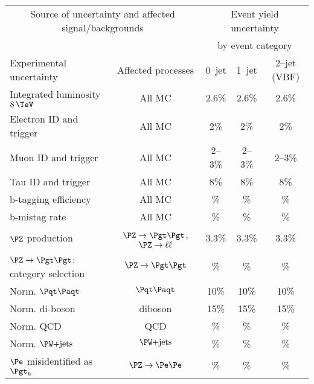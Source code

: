 
\begin{table}[tbhp]
\begin{center}
    \begin{tabular}{|l|c|c|c|c|}
    \hline
    \multicolumn{2}{|c|}{Source of uncertainty and affected signal/backgrounds} & \multicolumn{3}{|c|}{Event yield uncertainty}  \\
    \multicolumn{2}{|c|}{} & \multicolumn{3}{|c|}{by event category} \\
    \hline
     Experimental uncertainty                                  & Affected processes &  0--jet    &  1--jet  &  2--jet (VBF)      \\
     \hline
     Integrated luminosity $8\,\TeV$                           & All MC & 2.6\% & 2.6\% & 2.6\%       \\
     Electron ID and trigger                                   & All MC &  2\%  & 2\%  & 2\%       \\
     Muon ID and trigger                                       & All MC & 2--3\%       &   2--3\%    & 2--3\%       \\
     Tau ID and trigger                                        & All MC & 8\%  & 8\% & 8\%           \\
     b-tagging efficiency                                      & All MC & \% &   \%  & \% \\
     b-mistag rate                                             & All MC & \% & \%  & \%       \\
     \hline
     $\PZ$ production                                          & $\ZToTauTau$, $\PZ\to\ell\ell$ & 3.3\%     &   3.3\%    & 3.3\%      \\
     $\PZ\to\Pgt\Pgt$: category selection                      & $\ZToTauTau$ & \%  & \% & \%        \\
     Norm. $\ttbar$                                            & $\ttbar$ & 10\%  &   10\%  &  10\%        \\
     Norm. di-boson                                            & diboson & 15\%   &   15\%  &  15\%      \\
     Norm. QCD                                                 & QCD  & \% &  \% & \%         \\
     Norm. $\WJets$                                            & $\WJets$ & \% &  \% & \%             \\
     $\Pe$ misidentified as $\Pgth$                            & $\PZ\to\Pe\Pe$ & \%     & \%   & \%      \\

\end{tabular}
\end{center}
\end{table}
